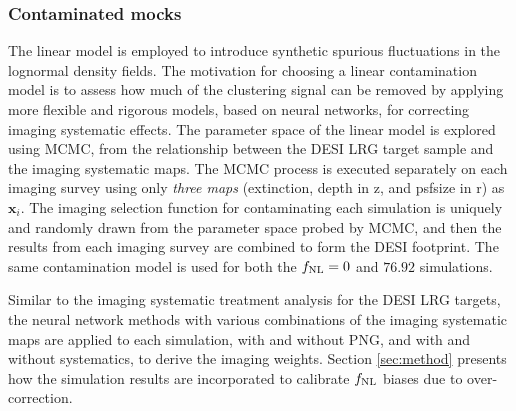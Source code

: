 \subsubsection{Contaminated mocks}
The linear model is employed to introduce synthetic spurious fluctuations in the lognormal density fields. The motivation for choosing a linear contamination model is to assess how much of the clustering signal can be removed by applying more flexible and rigorous models, based on neural networks, for correcting imaging systematic effects. The parameter space of the linear model is explored using MCMC, from the relationship between the DESI LRG target sample and the imaging systematic maps. The MCMC process is executed separately on each imaging survey using only \textit{three maps} (extinction, depth in z, and psfsize in r) as $\textbf{x}_{i}$. The imaging selection function for contaminating each simulation is uniquely and randomly drawn from the parameter space probed by MCMC, and then the results from each imaging survey are combined to form the DESI footprint. The same contamination model is used for both the $f_{\rm NL}=0$ and $76.92$ simulations.

Similar to the imaging systematic treatment analysis for the DESI LRG targets, the neural network methods with various combinations of the imaging systematic maps are applied to each simulation, with and without PNG, and with and without systematics, to derive the imaging weights. Section \ref{sec:method} presents how the simulation results are incorporated to calibrate $f_{\rm NL}$ biases due to over-correction. 